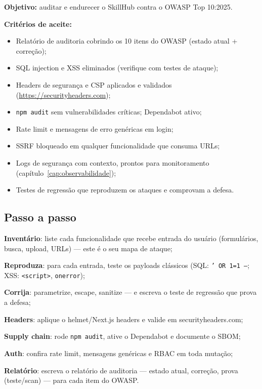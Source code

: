 \begin{caixaprojeto}
\textbf{Objetivo:} auditar e endurecer o SkillHub contra o OWASP Top 10:2025.

\textbf{Critérios de aceite:}
\begin{itemize}[leftmargin=*, itemsep=0.2em]
  \item Relatório de auditoria cobrindo os 10 itens do OWASP (estado atual + correção);
  \item SQL injection e XSS eliminados (verifique com testes de ataque);
  \item Headers de segurança e CSP aplicados e validados (\url{https://securityheaders.com});
  \item \texttt{npm audit} sem vulnerabilidades críticas; Dependabot ativo;
  \item Rate limit e mensagens de erro genéricas em login;
  \item SSRF bloqueado em qualquer funcionalidade que consuma URLs;
  \item Logs de segurança com contexto, prontos para monitoramento (capítulo~\ref{cap:observabilidade});
  \item Testes de regressão que reproduzem os ataques e comprovam a defesa.
\end{itemize}
\end{caixaprojeto}

\subsection{Passo a passo}

\begin{passos}
  \item \textbf{Inventário}: liste cada funcionalidade que recebe entrada do
  usuário (formulários, busca, upload, URLs) — este é o seu mapa de ataque;
  \item \textbf{Reproduza}: para cada entrada, teste os payloads clássicos
  (SQL: \texttt{' OR 1=1 --}; XSS: \texttt{<script>}, \texttt{onerror});
  \item \textbf{Corrija}: parametrize, escape, sanitize — e escreva o teste de
  regressão que prova a defesa;
  \item \textbf{Headers}: aplique o helmet/Next.js headers e valide em
  securityheaders.com;
  \item \textbf{Supply chain}: rode \texttt{npm audit}, ative o Dependabot e
  documente o SBOM;
  \item \textbf{Auth}: confira rate limit, mensagens genéricas e RBAC em toda
  mutação;
  \item \textbf{Relatório}: escreva o relatório de auditoria — estado atual,
  correção, prova (teste/scan) — para cada item do OWASP.
\end{passos}

